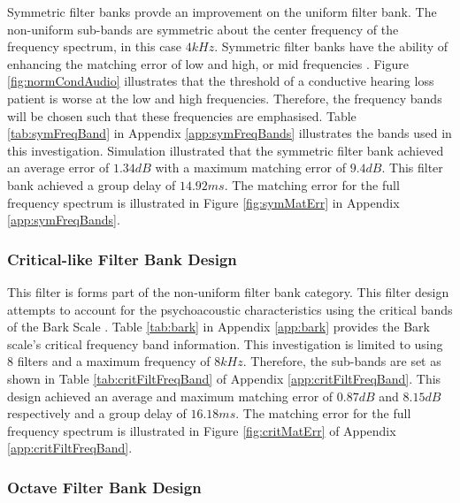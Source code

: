 \documentclass[11pt,onecolumn]{witseiepaper}
\begin{document}
\noindent Symmetric filter banks provde an improvement on the uniform filter bank. The non-uniform sub-bands are symmetric about the center frequency of the frequency spectrum, in this case $4kHz$. Symmetric filter banks have the ability of enhancing the matching error of low and high, or mid frequencies \cite{sebastian}. Figure \ref{fig:normCondAudio} illustrates that the threshold of a conductive hearing loss patient is worse at the low and high frequencies. Therefore, the frequency bands will be chosen such that these frequencies are emphasised. Table \ref{tab:symFreqBand} in Appendix \ref{app:symFreqBands} illustrates the bands used in this investigation. Simulation illustrated that the symmetric filter bank achieved an average error of $1.34dB$ with a maximum matching error of $9.4dB$. This filter bank achieved a group delay of $14.92ms$. The matching error for the full frequency spectrum is illustrated in Figure \ref{fig:symMatErr} in Appendix \ref{app:symFreqBands}.


\subsubsection{Critical-like Filter Bank Design}
\label{sec:critDesign}

\noindent This filter is forms part of the non-uniform filter bank category. This filter design attempts to account for the psychoacoustic characteristics using the critical bands of the Bark Scale \cite{chong}. Table \ref{tab:bark} in Appendix \ref{app:bark} provides the Bark scale's critical frequency band information. This investigation is limited to using $8$ filters and a maximum frequency of $8kHz$. Therefore, the sub-bands are set as shown in Table \ref{tab:critFiltFreqBand} of Appendix \ref{app:critFiltFreqBand}.	This design achieved an average and maximum matching error of $0.87dB$ and $8.15dB$ respectively and a group delay of $16.18ms$. The matching error for the full frequency spectrum is illustrated in Figure \ref{fig:critMatErr} of Appendix \ref{app:critFiltFreqBand}.


\subsubsection{Octave Filter Bank Design}
\label{sec:octDesign}
\end{document}
